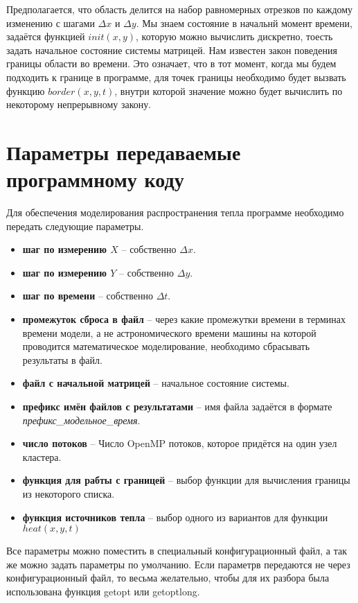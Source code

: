 \documentclass[10pt, a4paper]{article}
\begin{document}
Предполагается, что область делится на набор равномерных
отрезков по каждому изменению с шагами $\Delta{x}$ и $\Delta{y}$. Мы знаем состояние в 
начальнй момент времени, задаётся функцией $init(x,y)$, которую можно вычислить дискретно,
тоесть задать начальное состояние системы матрицей. Нам известен закон поведения 
границы области во времени. Это означает, что в тот момент, когда мы будем подходить к границе 
в программе, для точек границы необходимо будет вызвать функцию $border(x,y,t)$, внутри которой
значение можно будет вычислить по некоторому непрерывному закону. 

\section{Параметры передаваемые программному коду}

Для обеспечения моделирования распространения тепла программе необходимо передать следующие параметры.
\begin{itemize}
    \item {\bf шаг по измерению $X$ } -- собственно $\Delta{x}$.
    \item {\bf шаг по измерению $Y$ } -- собственно $\Delta{y}$.
    \item {\bf шаг по времени } -- собственно $\Delta{t}$.
    \item {\bf промежуток сброса в файл} -- через какие промежутки времени в терминах времени модели, 
                                            а не астрономического времени машины на которой проводится 
                                            математическое моделирование, необходимо сбрасывать результаты
                                            в файл.
   \item {\bf файл с начальной матрицей} -- начальное состояние системы.
   \item{\bf  префикс имён файлов с результатами} -- имя файла задаётся в формате 
         \textit{префикс\_модельное\_время}.
   \item {\bf число потоков} -- Число OpenMP потоков, которое придётся на один узел кластера.
   \item {\bf функция для рабты с границей } -- выбор функции для вычисления границы из некоторого списка.
   \item {\bf функция источников тепла} -- выбор одного из вариантов для функции $heat(x,y,t)$
\end{itemize}
Все параметры можно поместить в специальный конфигурационный файл, а так же можно задать параметры по умолчанию.
Если параметрв передаются не через конфигурационный файл, то весьма желательно, чтобы для их разбора была 
использована функция getopt или getoptlong.
\end{document}
